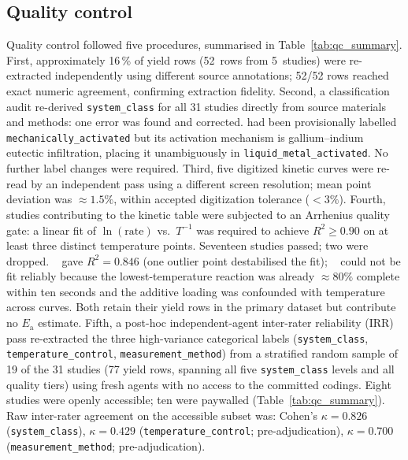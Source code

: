 \subsection{Quality control}
\label{sec:qc}

Quality control followed five procedures, summarised in Table~\ref{tab:qc_summary}.
First, approximately 16\,\% of yield rows (52~rows from 5~studies) were re-extracted
independently using different source annotations; 52/52 rows reached exact numeric
agreement, confirming extraction fidelity. Second, a classification audit
re-derived \texttt{system\_class} for all 31 studies directly from source materials and
methods: one error was found and corrected. \citeauthor{dudoladov2016}
\cite{dudoladov2016} had been provisionally labelled \texttt{mechanically\_activated}
but its activation mechanism is gallium--indium eutectic infiltration, placing it
unambiguously in \texttt{liquid\_metal\_activated}. No further label changes were
required. Third, five digitized kinetic curves were re-read by an independent pass
using a different screen resolution; mean point deviation was $\approx\!1.5\%$, within
accepted digitization tolerance ($<\!3\%$). Fourth, studies contributing to the kinetic
table were subjected to an Arrhenius quality gate: a linear fit of $\ln(\text{rate})$
vs.\ $T^{-1}$ was required to achieve $R^2\!\ge\!0.90$ on at least three distinct
temperature points. Seventeen studies passed; two were dropped.
\citeauthor{rin2021}~\cite{rin2021} gave $R^2\!=\!0.846$ (one outlier point destabilised
the fit); \citeauthor{ho2016}~\cite{ho2016} could not be fit reliably because the
lowest-temperature reaction was already $\approx\!80\%$ complete within ten seconds and
the additive loading was confounded with temperature across curves. Both retain their
yield rows in the primary dataset but contribute no $E_\mathrm{a}$ estimate.
Fifth, a post-hoc independent-agent inter-rater reliability (IRR) pass
re-extracted the three high-variance categorical labels
(\texttt{system\_class}, \texttt{temperature\_control}, \texttt{measurement\_method})
from a stratified random sample of 19 of the 31 studies
(77 yield rows, spanning all five \texttt{system\_class} levels and all quality tiers)
using fresh agents with no access to the committed codings.
Eight studies were openly accessible; ten were paywalled (Table~\ref{tab:qc_summary}).
Raw inter-rater agreement on the accessible subset was:
Cohen's $\kappa\!=\!0.826$ (\texttt{system\_class}),
$\kappa\!=\!0.429$ (\texttt{temperature\_control}; pre-adjudication),
$\kappa\!=\!0.700$ (\texttt{measurement\_method}; pre-adjudication).
